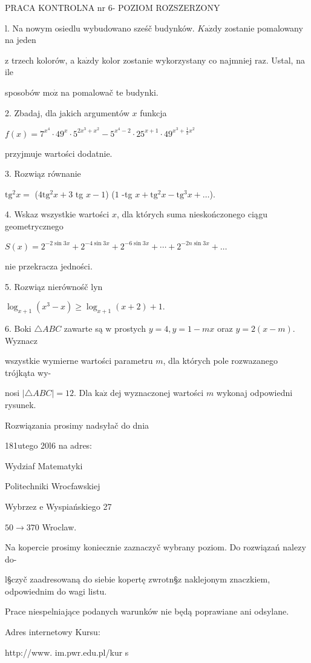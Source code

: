 \documentclass[a4paper,12pt]{article}
\begin{document}
PRACA KONTROLNA nr 6- POZIOM ROZSZERZONY

l. Na nowym osiedlu wybudowano sześč budynków. $K\mathrm{a}\dot{\mathrm{z}}\mathrm{d}\mathrm{y}$ zostanie pomalowany na jeden

$\mathrm{z}$ trzech kolorów, a $\mathrm{k}\mathrm{a}\dot{\mathrm{z}}\mathrm{d}\mathrm{y}$ kolor zostanie wykorzystany co najmniej $\mathrm{r}\mathrm{a}\mathrm{z}$. Ustal, na ile

sposobów $\mathrm{m}\mathrm{o}\dot{\mathrm{z}}$ na pomalowač te budynki.

2. Zbadaj, dla jakich argumentów $x$ funkcja

$f(x)=7^{x^{4}}\cdot 49^{x}\cdot 5^{2x^{3}+x^{2}}-5^{x^{4}-2}\cdot 25^{x+1}\cdot 49^{x^{3}+\frac{1}{2}x^{2}}$

przyjmuje wartości dodatnie.

3. Rozwiąz równanie

$\mathrm{t}\mathrm{g}^{2}x=$ ($4\mathrm{t}\mathrm{g}^{2}x+3$ tg $x-1$) ($1$ -tg $ x+\mathrm{t}\mathrm{g}^{2}x-\mathrm{t}\mathrm{g}^{3}x+\ldots$).

4. Wskaz wszystkie wartości $x$, dla których suma nieskończonego ciągu geometrycznego

$ S(x)=2^{-2\sin 3x}+2^{-4\sin 3x}+2^{-6\sin 3x}+\cdots+2^{-2n\sin 3x}+\ldots$

nie przekracza jedności.

5. Rozwiąz nierównośč $\mathrm{l}\mathrm{y}\mathrm{n}$

$\log_{x+1}(x^{3}-x)\geq\log_{x+1}(x+2)+1.$

6. Boki $\triangle ABC$ zawarte są $\mathrm{w}$ prostych $y=4, y= 1-mx$ oraz $y=2(x-m)$. Wyznacz

wszystkie wymierne wartości parametru $m$, dla których pole rozwazanego trójkąta wy-

nosi $|\triangle ABC|=12$. Dla $\mathrm{k}\mathrm{a}\dot{\mathrm{z}}$ dej wyznaczonej wartości $m$ wykonaj odpowiedni rysunek.

Rozwiązania prosimy nadsyłač do dnia

181utego 20l6 na adres:

Wydziaf Matematyki

Politechniki Wrocfawskiej

Wybrzez $\mathrm{e}$ Wyspiańskiego 27

$50\rightarrow 370$ Wroclaw.

Na kopercie prosimy koniecznie zaznaczyč wybrany poziom. Do rozwiązań nalezy do-

l\S czyč zaadresowaną do siebie kopertę zwrotn\S z naklejonym znaczkiem, odpowiednim do wagi listu.

Prace niespelniające podanych warunków nie będą poprawiane ani odsylane.

Adres internetowy Kursu:

http://www. im.pwr.edu.pl/kur s
\end{document}
